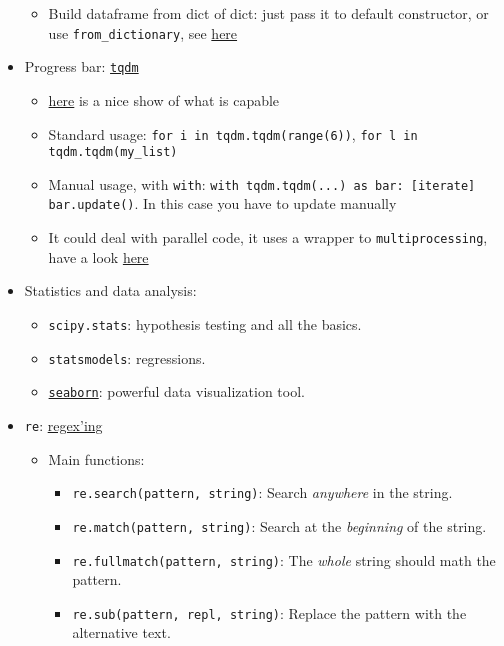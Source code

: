 \documentclass[a4paper,12pt,%
              final%
              ]{article}
\begin{document}
\begin{itemize}
\begin{itemize}
      \item Build dataframe from dict of dict: just pass it to default constructor, or use \verb|from_dictionary|, see \href{https://stackoverflow.com/questions/33157522/create-pandas-dataframe-from-dictionary-of-dictionaries}{here}
    \end{itemize}
  \item Progress bar: \href{https://github.com/tqdm/tqdm#manual}{\texttt{tqdm}}
    \begin{itemize}
      \item \href{https://www.analyticsvidhya.com/blog/2021/05/how-to-use-progress-bars-in-python/}{here} is a nice show of what is capable
      \item Standard usage: \verb|for i in tqdm.tqdm(range(6))|, \verb|for l in tqdm.tqdm(my_list)|
      \item Manual usage, with \texttt{with}: \verb|with tqdm.tqdm(...) as bar: [iterate] bar.update()|. In this case you have to update manually
      \item It could deal with parallel code, it uses a wrapper to \texttt{multiprocessing}, have a look \href{https://tqdm.github.io/docs/contrib.concurrent/}{here}
    \end{itemize}
  \item Statistics and data analysis:
    \begin{itemize}
      \item \texttt{scipy.stats}: hypothesis testing and all the basics.
      \item \texttt{statsmodels}: regressions.
      \item \href{https://seaborn.pydata.org/introduction.html}{\texttt{seaborn}}: powerful data visualization tool.
    \end{itemize}
  \item \texttt{re}: \href{https://docs.python.org/3/library/re.html}{regex'ing}
    \begin{itemize}
      \item Main functions:
        \begin{itemize}
          \item \verb|re.search(pattern, string)|: Search \emph{anywhere} in the string.
          \item \verb|re.match(pattern, string)|: Search at the \emph{beginning} of the string.
          \item \verb|re.fullmatch(pattern, string)|: The \emph{whole} string should math the pattern.
          \item \verb|re.sub(pattern, repl, string)|: Replace the pattern with the alternative text.

\end{itemize}
\end{itemize}
\end{itemize}
\end{document}
